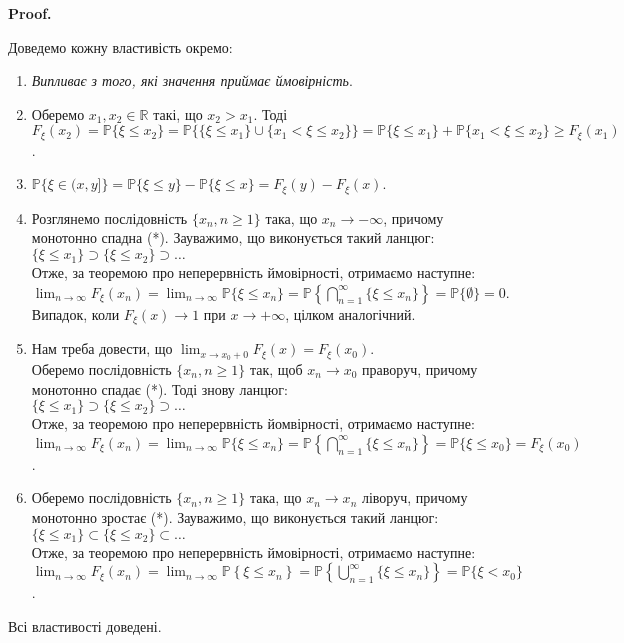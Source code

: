 \documentclass[a4paper, 10pt]{article}
\makeatletter
\theoremstyle{theoremdd}
\renewenvironment{proof}[1][Proof.\\]{\par
\pushQED{\hfill \qed}%
\normalfont \topsep6\p@\@plus6\p@\relax
\trivlist
\item\relax
{\bfseries
#1\@addpunct{.}}\hspace\labelsep\ignorespaces
}{%
\popQED\endtrivlist\@endpefalse
}
\makeatother
\begin{document}
\begin{proof}
Доведемо кожну властивість окремо:
\begin{enumerate}[wide=0pt,label={\arabic*)}]
\item \textit{Випливає з того, які значення приймає ймовірність}.
\item Оберемо $x_1,x_2 \in \mathbb{R}$ такі, що $x_2 > x_1$. Тоді\\
$F_\xi(x_2) = \mathbb{P}\{\xi \leq x_2\} = \mathbb{P}\{ \{\xi \leq x_1\} \cup \{x_1 < \xi \leq x_2 \}\} = \mathbb{P}\{\xi \leq x_1\} + \mathbb{P}\{x_1 < \xi \leq x_2\} \geq F_\xi(x_1)$.
\item $\mathbb{P}\{\xi \in (x,y]\} = \mathbb{P}\{\xi \leq y\} - \mathbb{P}\{\xi \leq x\} = F_\xi(y) - F_\xi(x)$.
\item Розглянемо послідовність $\{x_n, n \geq 1\}$ така, що $x_n \to -\infty$, причому монотонно спадна (*). Зауважимо, що виконується такий ланцюг:\\
$\{\xi \leq x_{1}\} \supset \{\xi \leq x_{2}\} \supset \dots$\\
Отже, за теоремою про неперервність ймовірності, отримаємо наступне:\\
$\displaystyle\lim_{n \to \infty} F_\xi (x_{n}) = \lim_{n \to \infty} \mathbb{P}\{\xi \leq x_{n}\} = \mathbb{P} \left\{ \bigcap_{n=1}^\infty \{\xi \leq x_{n}\} \right\} = \mathbb{P}\{\emptyset\} = 0$.\\
Випадок, коли $F_\xi(x) \to 1$ при $x \to +\infty$, цілком аналогічний.
\item Нам треба довести, що $\displaystyle\lim_{x \to x_0+0} F_\xi(x) = F_\xi(x_0)$.\\
Оберемо послідовність $\{x_n, n \geq 1\}$ так, щоб $x_n \to x_0$ праворуч, причому монотонно спадає (*). Тоді знову ланцюг:\\
$\{\xi \leq x_1\} \supset \{\xi \leq x_2\} \supset \dots$\\
Отже, за теоремою про неперервність йомвірності, отримаємо наступне:\\
$\displaystyle\lim_{n \to \infty} F_\xi(x_n) = \lim_{n \to \infty} \mathbb{P}\{\xi \leq x_n\} = \mathbb{P} \left\{ \bigcap_{n=1}^\infty \{\xi \leq x_n\} \right\} = \mathbb{P} \{\xi \leq x_0\} = F_\xi(x_0)$.
\item Оберемо послідовність $\{x_n, n \geq 1\}$ така, що $x_n \to x_n$ ліворуч, причому монотонно зростає (*). Зауважимо, що виконується такий ланцюг:\\
$\{\xi \leq x_1\} \subset \{\xi \leq x_2\} \subset \dots$\\
Отже, за теоремою про неперервність ймовірності, отримаємо наступне:\\
$\displaystyle\lim_{n \to \infty} F_\xi(x_n) = \lim_{n \to \infty} \mathbb{P}\left\{ \xi \leq x_n\right\} = \mathbb{P}\left\{ \bigcup_{n=1}^\infty \{\xi \leq x_n\} \right\} = \mathbb{P}\{\xi < x_0\}$.
\end{enumerate}
Всі властивості доведені.
\end{proof}
\end{document}
